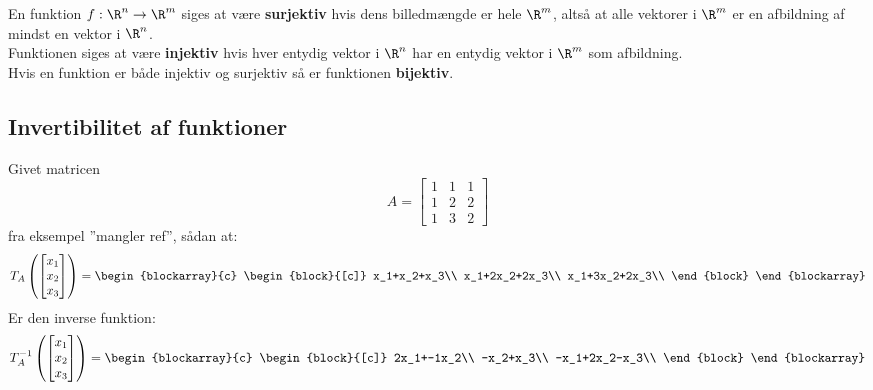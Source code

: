 
\begin{defn}{}{}
En funktion $f:\R^n \rightarrow \R^m$ siges at være \textbf{surjektiv} hvis dens billedmængde er hele $\R^m$, altså at alle vektorer i $\R^m$ er en afbildning af mindst en vektor i $\R^n$.\\
Funktionen siges at være \textbf{injektiv} hvis hver entydig vektor i $\R^n$ har en entydig vektor i $\R^m$ som afbildning.\\
Hvis en funktion er både injektiv og surjektiv så er funktionen \textbf{bijektiv}.
\end{defn}

\subsection{Invertibilitet af funktioner}



\begin{eks}
Givet matricen 
\begin{equation*}
A=
\begin{bmatrix}
1 & 1 & 1\\
1 & 2 & 2\\
1 & 3 & 2
\end{bmatrix}
\end{equation*}  fra eksempel ''mangler ref'', sådan at:
\begin{equation*}
T_A
\left(
\begin{bmatrix}
x_1\\
x_2\\
x_3
\end{bmatrix}
\right)
=
\begin{blockarray}{c}
\begin{block}{[c]}
x_1+x_2+x_3\\
x_1+2x_2+2x_3\\
x_1+3x_2+2x_3\\
\end{block}
\end{blockarray}
\end{equation*}
Er den inverse funktion:
\begin{equation*}
T_{A}^{-1}\left(
\begin{bmatrix}
x_1\\
x_2\\
x_3
\end{bmatrix}
\right)=
\begin{blockarray}{c}
\begin{block}{[c]}
2x_1+-1x_2\\
-x_2+x_3\\
-x_1+2x_2-x_3\\
\end{block}
\end{blockarray}
\end{equation*}
\end{eks}